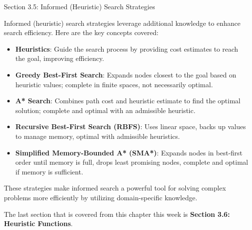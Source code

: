 \begin{notes}{Section 3.5: Informed (Heuristic) Search Strategies}
\begin{highlight}
    \end{highlight}
    
    \begin{highlight}
    
    Informed (heuristic) search strategies leverage additional knowledge to enhance search efficiency. Here are the key concepts covered:
    
    \begin{itemize}
        \item \textbf{Heuristics}: Guide the search process by providing cost estimates to reach the goal, improving efficiency.
        \item \textbf{Greedy Best-First Search}: Expands nodes closest to the goal based on heuristic values; complete in finite spaces, not necessarily optimal.
        \item \textbf{A* Search}: Combines path cost and heuristic estimate to find the optimal solution; complete and optimal with an admissible heuristic.
        \item \textbf{Recursive Best-First Search (RBFS)}: Uses linear space, backs up values to manage memory, optimal with admissible heuristics.
        \item \textbf{Simplified Memory-Bounded A* (SMA*)}: Expands nodes in best-first order until memory is full, drops least promising nodes, complete and optimal if memory is sufficient.
    \end{itemize}
    
    These strategies make informed search a powerful tool for solving complex problems more efficiently by utilizing domain-specific knowledge.
    
    \end{highlight}
\end{notes}

The last section that is covered from this chapter this week is \textbf{Section 3.6: Heuristic Functions}.

